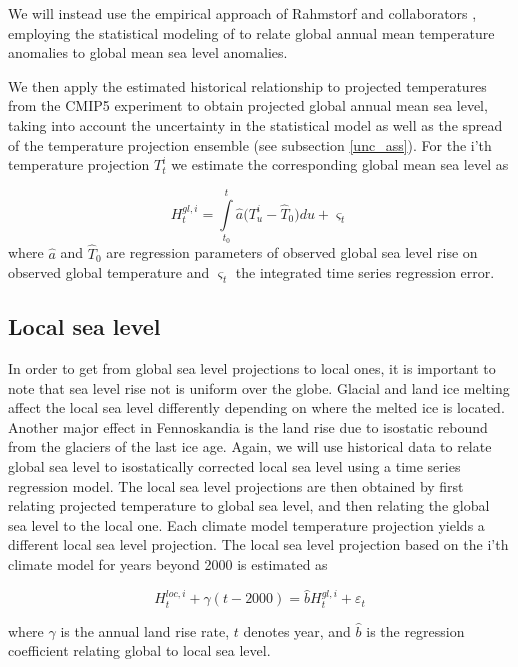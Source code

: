 \documentclass[draft,linenumbers]{agujournal}
\begin{document}
We will instead use the empirical approach of Rahmstorf and collaborators \citep{Rahmstorf07,Rahmstorf11}, employing the statistical modeling of \citet{Bolin2014a} to relate global annual mean temperature anomalies to global mean sea level anomalies. 


We then apply the estimated historical relationship to projected temperatures from the CMIP5 experiment \citep{cmip5} to obtain projected global annual mean sea level, taking into account the uncertainty in the statistical model as well as the spread of the temperature projection ensemble (see subsection \ref{unc_ass}). 
For the i'th temperature projection $T_t^i$ we estimate the corresponding global mean sea level as

\[H_t^{gl,i} = \int\limits_{{t_0}}^t {{\hat a} (T_u^i - {{\hat T}_0}} )du + {\varsigma _t}\]
where ${\hat a}$ and ${\hat T}_0$ are regression parameters of observed global sea level  rise on observed global temperature and $\varsigma_t$ the integrated time series regression error.



\subsection{Local sea level}
In order to get from global sea level projections to local ones, it is important to note that sea level rise not is uniform over the globe. Glacial and land ice melting affect the local sea level differently depending on where the melted ice is located.
Another major effect in Fennoskandia is the land rise due to isostatic rebound from the glaciers of the last ice age. 
Again, we will use historical data to relate global sea level to isostatically corrected local sea level using a time series regression model. 
The local sea level projections are then obtained by first relating projected temperature to global sea level, and then relating the global sea level to the local one. Each climate model temperature projection yields a different local sea level projection. The local sea level projection based on the i'th climate model for years beyond 2000 is estimated as

\[H_t^{loc,i} + \gamma (t -2000 ) = {\hat b} H_t^{gl,i}  + {\varepsilon _t}\]


where $\gamma$ is the annual land rise rate, $t$ denotes year, and $ {\hat b} $ is the regression coefficient relating global to local sea level.
\end{document}
